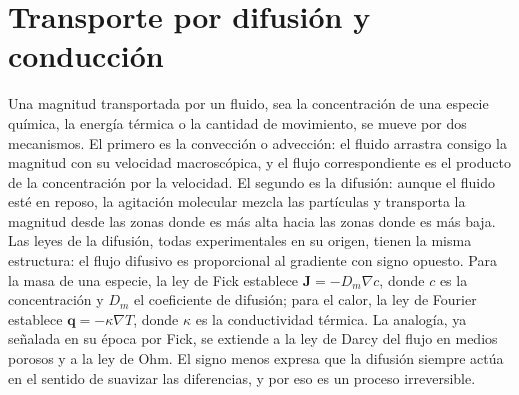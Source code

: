\documentclass[10pt,openany]{book}
\begin{document}
\section{Transporte por difusión y conducción}

Una magnitud transportada por un fluido, sea la concentración de una especie química, la energía térmica o la cantidad de movimiento, se mueve por dos mecanismos. El primero es la convección o advección: el fluido arrastra consigo la magnitud con su velocidad macroscópica, y el flujo correspondiente es el producto de la concentración por la velocidad. El segundo es la difusión: aunque el fluido esté en reposo, la agitación molecular mezcla las partículas y transporta la magnitud desde las zonas donde es más alta hacia las zonas donde es más baja. Las leyes de la difusión, todas experimentales en su origen, tienen la misma estructura: el flujo difusivo es proporcional al gradiente con signo opuesto. Para la masa de una especie, la ley de Fick establece \(\mathbf{J} = -D_m\nabla c\), donde \(c\) es la concentración y \(D_m\) el coeficiente de difusión; para el calor, la ley de Fourier establece \(\mathbf{q} = -\kappa\nabla T\), donde \(\kappa\) es la conductividad térmica. La analogía, ya señalada en su época por Fick, se extiende a la ley de Darcy del flujo en medios porosos y a la ley de Ohm. El signo menos expresa que la difusión siempre actúa en el sentido de suavizar las diferencias, y por eso es un proceso irreversible.
\end{document}
